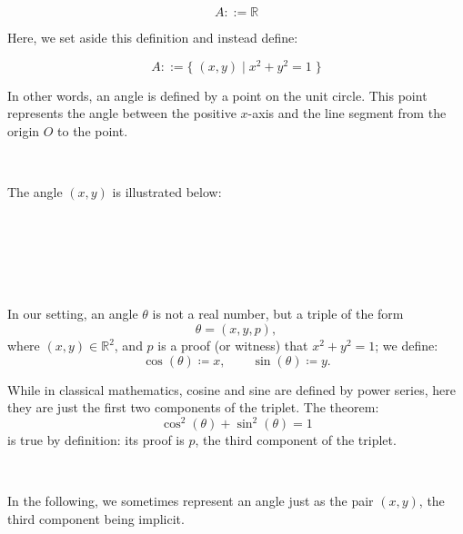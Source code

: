 \documentclass[11pt]{article}
\theoremstyle{definition}
\begin{document}
\[
A ::= \mathbb{R}
\]

\noindent Here, we set aside this definition and instead define:

\[
A ::= \{ \; (x, y) \; | \; x^2 + y^2 = 1 \; \}
\]

\noindent In other words, an angle is defined by a point on the unit
circle. This point represents the angle between the positive \( x
\)-axis and the line segment from the origin \( O \) to the point.

\

\noindent The angle \( (x, y) \) is illustrated below:

\


\

\

\noindent In our setting, an angle \( \theta \) is not a real number,
but a triple of the form
\[
\theta = (x, y, p),
\]
where \( (x, y) \in \mathbb{R}^2 \), and \( p \) is a proof (or
witness) that \( x^2 + y^2 = 1 \); we define:
\[
\cos(\theta) \coloneqq x, \qquad \sin(\theta) \coloneqq y.
\]

\noindent While in classical mathematics, cosine and sine are defined
by power series, here they are just the first two components of the
triplet. The theorem:
\[
\cos^2(\theta) + \sin^2(\theta) = 1
\]
is true by definition: its proof is $p$, the third component of the
triplet.

\

\noindent In the following, we sometimes represent an angle just as
the pair $(x, y)$, the third component being implicit.

\
\end{document}
